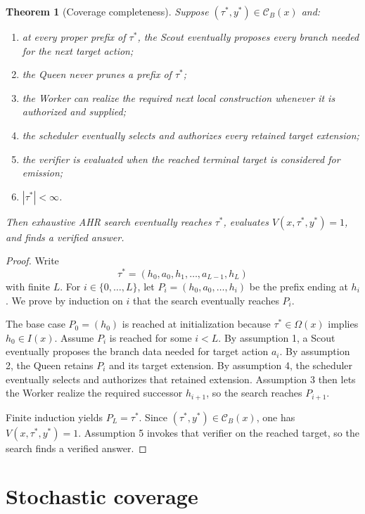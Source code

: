 \documentclass[11pt,oneside]{book}
\newtheorem{theorem}[definition]{Theorem}
\theoremstyle{remark}
\newcommand{\Om}{\Omega}
\newcommand{\cB}{\mathcal C_B}
\begin{document}
\begin{theorem}[Coverage completeness]
Suppose $(\tau^*,y^*)\in\cB(x)$ and:
\begin{enumerate}
  \item at every proper prefix of $\tau^*$, the Scout eventually proposes every branch needed for the next target action;
  \item the Queen never prunes a prefix of $\tau^*$;
  \item the Worker can realize the required next local construction whenever it is authorized and supplied;
  \item the scheduler eventually selects and authorizes every retained target extension;
  \item the verifier is evaluated when the reached terminal target is
  considered for emission;
  \item $|\tau^*|<\infty$.
\end{enumerate}
Then exhaustive AHR search eventually reaches $\tau^*$, evaluates
$V(x,\tau^*,y^*)=1$, and finds a verified answer.
\end{theorem}

\begin{proof}
Write
\[
\tau^*=(h_0,a_0,h_1,\ldots,a_{L-1},h_L)
\]
with finite $L$. For $i\in\{0,\ldots,L\}$, let
$P_i=(h_0,a_0,\ldots,h_i)$ be the prefix ending at $h_i$. We prove by
induction on $i$ that the search eventually reaches $P_i$.

The base case $P_0=(h_0)$ is reached at initialization because
$\tau^*\in\Om(x)$ implies $h_0\in I(x)$. Assume $P_i$ is reached for some
$i<L$. By assumption 1, a Scout eventually proposes the branch data needed
for target action $a_i$. By assumption 2, the Queen retains $P_i$ and its
target extension. By assumption 4, the scheduler eventually selects and
authorizes that retained extension. Assumption 3 then lets the Worker realize
the required successor $h_{i+1}$, so the search reaches $P_{i+1}$.

Finite induction yields $P_L=\tau^*$. Since
$(\tau^*,y^*)\in\cB(x)$, one has $V(x,\tau^*,y^*)=1$. Assumption 5 invokes
that verifier on the reached target, so the search finds a verified answer.
\end{proof}

\section{Stochastic coverage}
\end{document}
